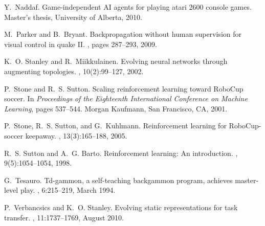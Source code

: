\documentclass{sig-alternate}
\begin{document}
\begin{thebibliography}{10}
Y.~Naddaf.
\newblock Game-independent AI agents for playing atari 2600 console games.
\newblock Master's thesis, University of Alberta, 2010.

M.~Parker and B.~Bryant.
\newblock Backpropagation without human supervision for visual control in quake
  II.
, pages 287--293, 2009.

K.~O. Stanley and R.~Miikkulainen.
\newblock Evolving neural networks through augmenting topologies.
, 10(2):99--127, 2002.

P.~Stone and R.~S. Sutton.
\newblock Scaling reinforcement learning toward {R}obo{C}up soccer.
\newblock In {\em Proceedings of the Eighteenth International Conference on
  Machine Learning}, pages 537--544. Morgan Kaufmann, San Francisco, CA, 2001.

P.~Stone, R.~S. Sutton, and G.~Kuhlmann.
\newblock Reinforcement learning for {R}obo{C}up-soccer keepaway.
, 13(3):165--188, 2005.

R.~S. Sutton and A.~G. Barto.
\newblock Reinforcement learning: An introduction.
, 9(5):1054--1054, 1998.

G.~Tesauro.
\newblock Td-gammon, a self-teaching backgammon program, achieves master-level
  play.
, 6:215--219, March 1994.

P.~Verbancsics and K.~O. Stanley.
\newblock Evolving static representations for task transfer.
, 11:1737--1769, August 2010.

\end{thebibliography}
\end{document}
